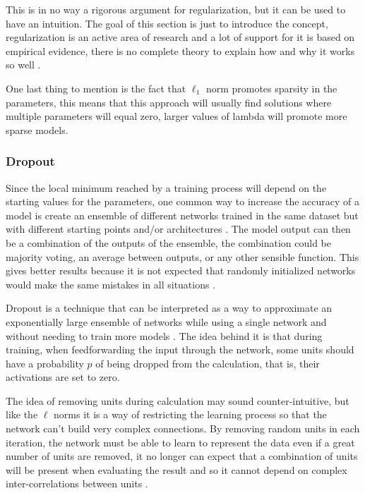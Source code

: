 This is in no way a rigorous argument for regularization, but it can be used to have an intuition. The goal of this section is just to introduce the concept, regularization is an active area of research and a lot of support for it is based on empirical evidence, there is no complete theory to explain how and why it works so well \cite[chap. 3]{NN&DL2015}.

One last thing to mention is the fact that $\ell_1$ norm promotes sparsity in the parameters, this means that this approach will usually find solutions where multiple parameters will equal zero, larger values of \gls{lambda} will promote more sparse models.

\subsubsection{Dropout}
Since the local minimum reached by a training process will depend on the starting values for the parameters, one common way to increase the accuracy of a model is create an ensemble of different networks trained in the same dataset but with different starting points and/or architectures \cite[Chapter 6]{NN&DL2015}. The model output can then be a combination of the outputs of the ensemble, the combination could be majority voting, an average between outputs, or any other sensible function. This gives better results because it is not expected that randomly initialized networks would make the same mistakes in all situations \cite[p. 253]{deepLearningBook2016}.

Dropout is a technique that can be interpreted as a way to approximate an exponentially large ensemble of networks while using a single network and without needing to train more models \cite{dropout2012}. The idea behind it is that during training, when feedforwarding the input through the network, some units should have a probability $p$ of being dropped from the calculation, that is, their activations are set to zero.

The idea of removing units during calculation may sound counter-intuitive, but like the $\ell$ norms it is a way of restricting the learning process so that the network can't build very complex connections. By removing random units in each iteration, the network must be able to learn to represent the data even if a great number of units are removed, it no longer can expect that a combination of units will be present when evaluating the result and so it cannot depend on complex inter-correlations between units \cite{dropout2012}.

